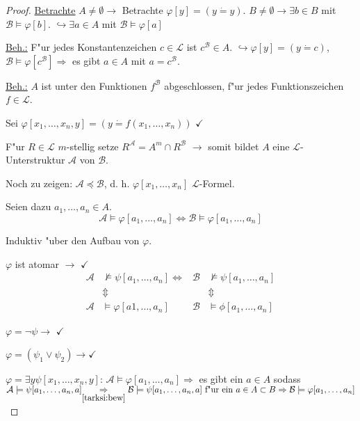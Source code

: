 \documentclass[a4paper,12pt,numbers=noenddot,parskip=full]{scrartcl}
\newcommand{\scrL}{\mathcal{L}}
\newcommand{\scrA}{\mathcal{A}}
\newcommand{\scrB}{\mathcal{B}}
\theoremstyle{dotless}
\theoremstyle{remark}
\begin{document}
\begin{proof}
	\underline{Betrachte} $A \neq \emptyset \rightarrow$ Betrachte $\varphi[y] = (y \dot= y)$. $B \neq \emptyset \rightarrow \exists b \in B$ mit $\scrB \models \varphi[b]$. $\hookrightarrow \exists a \in A$ mit $\scrB \models \varphi[a]$
	
	\underline{Beh.:} F"ur jedes Konstantenzeichen $c \in \scrL$ ist $c^\scrB \in A$. $\hookrightarrow \varphi[y] = (y \dot= c)$, $\scrB \models \varphi[c^\scrB] \Rightarrow$ es gibt $a \in A$ mit $a=c^\scrB$.
	
	\underline{Beh.:} $A$ ist unter den Funktionen $f^\scrB$ abgeschlossen, f"ur jedes Funktionszeichen $f \in \scrL$.
	
	Sei $\varphi[x_1, \dots, x_n, y] = (y \dot= f(x_1, \dots, x_n))$ $\checkmark$
	
	F"ur $R \in \scrL$ $m$-stellig setze $R^\scrA = A^m \cap R^\scrB$ $\longrightarrow$ somit bildet $A$ eine $\scrL$-Unterstruktur $\scrA$ von $\scrB$.
	
	Noch zu zeigen: $\scrA \preceq \scrB$, d. h. $\varphi[x_1, \dots, x_n]$ $\scrL$-Formel.
	
	Seien dazu $a_1, \dots, a_n \in A$.
	\begin{equation}\label{tarksi:bew}
		\scrA \models \varphi[a_1, \dots, a_n] \Leftrightarrow \scrB \models \varphi[a_1, \dots,a_n]
	\end{equation}
	
	Induktiv "uber den Aufbau von $\varphi$.
	
	$\varphi$ ist atomar $\longrightarrow$ $\checkmark$
	\begin{align*}
		\scrA &\not\models \psi[a_1, \dots, a_n] \Leftrightarrow &\scrB &\not\models \psi[a_1, \dots, a_n]\\
		&\Updownarrow &&\Updownarrow\\
		\scrA &\models \varphi[a1, \dots, a_n] &\scrB &\models \phi[a_1, \dots, a_n]
	\end{align*}
	
	$\varphi= \lnot \psi \longrightarrow$ $\checkmark$
	
	$\varphi = (\psi_1 \lor \psi_2) \longrightarrow \checkmark$
	
	$\varphi = \exists y \psi[x_1, \dots, x_n, y]$: $\scrA \models \varphi[a_1, \dots, a_n] \Rightarrow$ es gibt ein $a \in A$ sodass $\scrA \models \psi[a_1, \dots, a_n, a]\\ {\underset{\ref{tarksi:bew}}{\Rightarrow} \scrB \models \psi[a_1, \dots, a_n, a]} \text{ f"ur ein } a \in A \subset B \Rightarrow \scrB \models \varphi[a_1, \dots, a_n]$
	

\end{proof}
\end{document}
